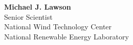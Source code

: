 \documentclass[10pt]{article}
\begin{document}
\begin{centering}
\textbf{Michael J. Lawson}\\
Senior Scientist\\
National Wind Technology Center \\
National Renewable Energy Laboratory\\
\end{centering}

\vspace{-0.15in}


\vspace{-0.15in}


\vspace{-0.15in}


\vspace{-0.15in}


\vspace{-0.15in}


\vspace{-0.15in}


% 
\end{document}
